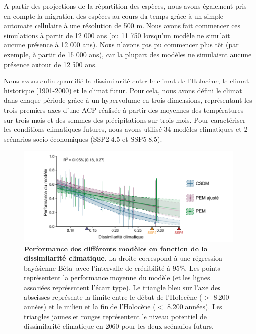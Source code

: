 A partir des projections de la répartition des espèces, nous avons également pris en compte la migration des espèces au cours du temps grâce à un simple automate cellulaire \citep{Engler2012} à une résolution de 500 m. Nous avons fait commencer ces simulations à partir de 12 000 ans (ou 11 750 lorsqu'un modèle ne simulait aucune présence à 12 000 ans). Nous n'avons pas pu commencer plus tôt (par exemple, à partir de 15 000 ans), car la plupart des modèles ne simulaient aucune présence autour de 12 500 ans.

Nous avons enfin quantifié la dissimilarité entre le climat de l'Holocène, le climat historique (1901-2000) et le climat futur. Pour cela, nous avons défini le climat dans chaque période grâce à un hypervolume en trois dimensions, représentant les trois premiers axes d'une ACP réalisée à partir des moyennes des températures sur trois mois et des sommes des précipitations sur trois mois. Pour caractériser les conditions climatiques futures, nous avons utilisé 34 modèles climatiques \citep{Thrasher2022} et 2 scénarios socio-économiques (SSP2-4.5 et SSP5-8.5).

\begin{figure}
\vspace*{-0cm}
\centering
\includegraphics{resume/figs/pastperformance_FR.pdf}
\caption{\textbf{Performance des différents modèles en fonction de la dissimilarité climatique}. La droite correspond à une régression bayésienne Bêta, avec l'intervalle de crédibilité à 95\%. Les points représentent la performance moyenne du modèle (et les lignes associées représentent l'écart type). Le triangle bleu sur l'axe des abscisses représente la limite entre le début de l'Holocène ($>$ 8.200 années) et le milieu et la fin de l'Holocène ($<$ 8.200 années). Les triangles jaunes et rouges représentent le niveau potentiel de dissimilarité climatique en 2060 pour les deux scénarios futurs.}
\vspace*{-0cm}
\label{fig:R4}
\end{figure}

